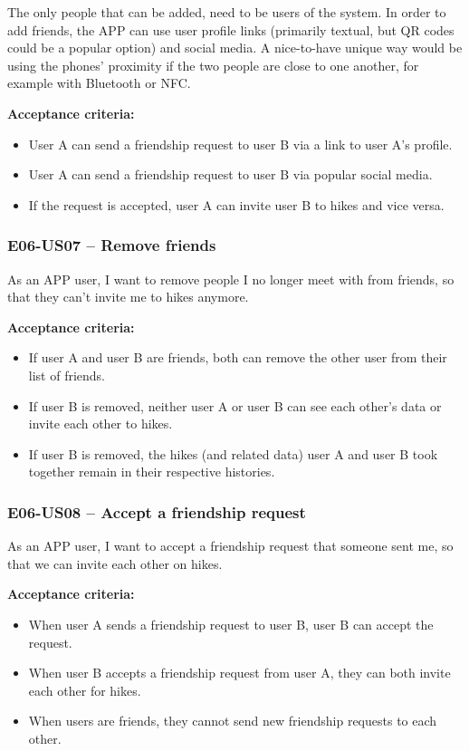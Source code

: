 The only people that can be added, need to be users of the system.
In order to add friends, the APP can use user profile links (primarily textual, but QR codes could be a popular option) and social media.
A nice-to-have unique way would be using the phones' proximity if the two people are close to one another, for example with Bluetooth or NFC.

\textbf{Acceptance criteria:}
\begin{itemize}
    \item User A can send a friendship request to user B via a link to user A's profile.
    \item User A can send a friendship request to user B via popular social media.
    \item If the request is accepted, user A can invite user B to hikes and vice versa.
\end{itemize}

\subsubsection*{E06-US07 -- Remove friends}
As an APP user, I want to remove people I no longer meet with from friends, so that they can't invite me to hikes anymore.

\textbf{Acceptance criteria:}
\begin{itemize}
    \item If user A and user B are friends, both can remove the other user from their list of friends.
    \item If user B is removed, neither user A or user B can see each other's data or invite each other to hikes.
    \item If user B is removed, the hikes (and related data) user A and user B took together remain in their respective histories.
\end{itemize}

\subsubsection*{E06-US08 -- Accept a friendship request}
As an APP user, I want to accept a friendship request that someone sent me, so that we can invite each other on hikes.

\textbf{Acceptance criteria:}
\begin{itemize}
    \item When user A sends a friendship request to user B, user B can accept the request.
    \item When user B accepts a friendship request from user A, they can both invite each other for hikes.
    \item When users are friends, they cannot send new friendship requests to each other.
\end{itemize}



